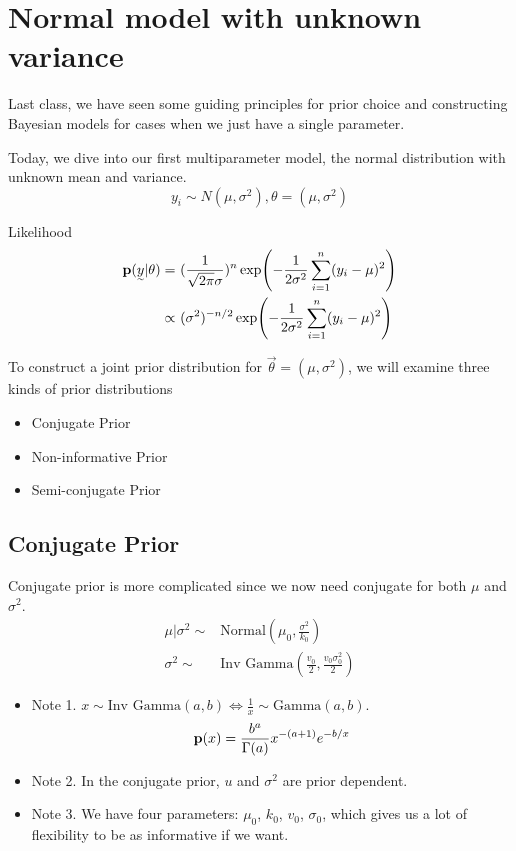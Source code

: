 \section{Normal model with unknown variance}

Last class, we have seen some guiding principles for prior choice and constructing Bayesian models for cases when we just have a single parameter.

Today, we dive into our first multiparameter model, the normal distribution with unknown mean and variance.
\[
y_i \sim N(\mu, \sigma^2), \theta = (\mu, \sigma^2)
\]

Likelihood
\begin{align*}
    \p(\vec{y}| \theta) 
    =&~ (\frac{1}{\sqrt{2\pi}\sigma})^n \exp(-\frac{1}{2\sigma^2} \sum_{i=1}^n(y_i - \mu)^2)\\
    \propto&~ (\sigma^2)^{-n/2} \exp(-\frac{1}{2\sigma^2} \sum_{i=1}^n(y_i - \mu)^2)
\end{align*}

To construct a joint prior distribution for $\vec{\theta} = (\mu, \sigma^2)$, we will examine three kinds of prior distributions
\begin{itemize}
    \item Conjugate Prior
    \item Non-informative Prior
    \item Semi-conjugate Prior
\end{itemize}

\subsection{Conjugate Prior}

Conjugate prior is more complicated since we now need conjugate for both $\mu$ and $\sigma^2$.
\begin{align*}
    \mu| \sigma^2 \sim& \text{Normal}(\mu_0, \frac{\sigma^2}{k_0})\\
    \sigma^2 \sim& \text{Inv Gamma} (\frac{v_0}{2}, \frac{v_0 \sigma^2_0}{2})
\end{align*}

\begin{itemize}
    \item Note 1. $x \sim \text{Inv Gamma} (a, b) \iff \frac{1}{x} \sim \text{Gamma}(a, b)$.
    \[
        {\mathbf p}(x) = \frac{b^a}{\Gamma(a)} x^{-(a+1)} e^{-b/x}
    \]
    \item Note 2. In the conjugate prior, $u$ and $\sigma^2$ are prior dependent.
    \item Note 3. We have four parameters: $\mu_0$, $k_0$, $v_0$, $\sigma_0$, which gives us a lot of flexibility to be as informative if we want.
\end{itemize}

